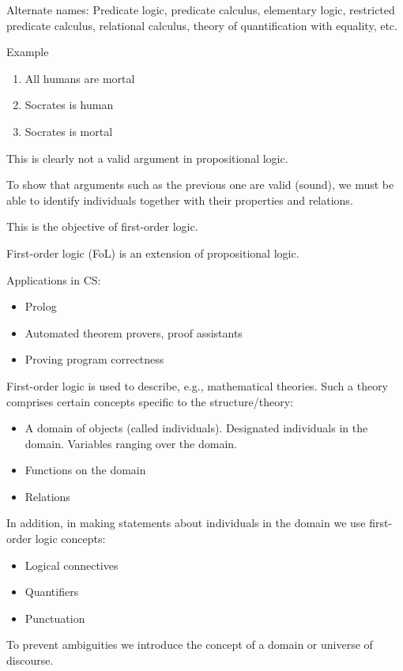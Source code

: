\documentclass{article}
\begin{document}
Alternate names: Predicate logic, predicate calculus, elementary logic, restricted predicate calculus, relational calculus, theory of quantification with equality, etc.

Example

\begin{enumerate}
    \item All humans are mortal
    \item Socrates is human
    \item Socrates is mortal
\end{enumerate}

This is clearly not a valid argument in propositional logic. 

To show that arguments such as the previous one are valid (sound), we must be able to identify individuals together with their properties and relations.

This is the objective of first-order logic.

First-order logic (FoL) is an extension of propositional logic.

Applications in CS:
\begin{itemize}
    \item Prolog
    \item Automated theorem provers, proof assistants
    \item Proving program correctness
\end{itemize}

First-order logic is used to describe, e.g., mathematical theories. Such a theory comprises certain concepts specific to the structure/theory:
\begin{itemize}
    \item A domain of objects (called individuals). Designated individuals in the domain. Variables ranging over the domain.
    \item Functions on the domain
    \item Relations
\end{itemize}

In addition, in making statements about individuals in the domain we use first-order logic concepts:
\begin{itemize}
    \item Logical connectives
    \item Quantifiers
    \item Punctuation
\end{itemize}

To prevent ambiguities we introduce the concept of a domain or universe of discourse.
\end{document}
